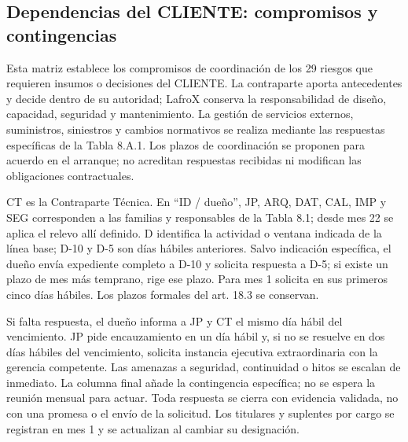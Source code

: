 \documentclass[carta,firma,sinnotas]{lafrox}
\begin{document}
\subsection*{Dependencias del CLIENTE: compromisos y contingencias}

Esta matriz establece los compromisos de coordinación de los 29 riesgos que requieren insumos o decisiones del CLIENTE. La contraparte aporta antecedentes y decide dentro de su autoridad; LafroX conserva la responsabilidad de diseño, capacidad, seguridad y mantenimiento. La gestión de servicios externos, suministros, siniestros y cambios normativos se realiza mediante las respuestas específicas de la Tabla 8.A.1. Los plazos de coordinación se proponen para acuerdo en el arranque; no acreditan respuestas recibidas ni modifican las obligaciones contractuales.

CT es la Contraparte Técnica. En ``ID / dueño'', JP, ARQ, DAT, CAL, IMP y SEG corresponden a las familias y responsables de la Tabla 8.1; desde mes 22 se aplica el relevo allí definido. D identifica la actividad o ventana indicada de la línea base; D-10 y D-5 son días hábiles anteriores. Salvo indicación específica, el dueño envía expediente completo a D-10 y solicita respuesta a D-5; si existe un plazo de mes más temprano, rige ese plazo. Para mes 1 solicita en sus primeros cinco días hábiles. Los plazos formales del art. 18.3 se conservan.

Si falta respuesta, el dueño informa a JP y CT el mismo día hábil del vencimiento. JP pide encauzamiento en un día hábil y, si no se resuelve en dos días hábiles del vencimiento, solicita instancia ejecutiva extraordinaria con la gerencia competente. Las amenazas a seguridad, continuidad o hitos se escalan de inmediato. La columna final añade la contingencia específica; no se espera la reunión mensual para actuar. Toda respuesta se cierra con evidencia validada, no con una promesa o el envío de la solicitud. Los titulares y suplentes por cargo se registran en mes 1 y se actualizan al cambiar su designación.
\end{document}
